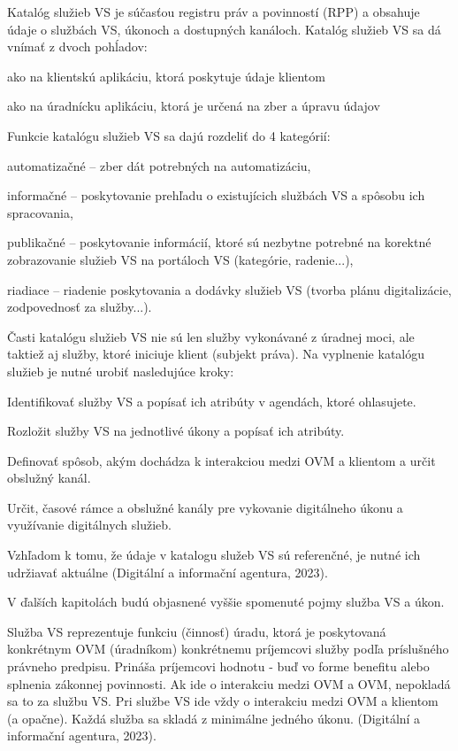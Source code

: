 Katalóg služieb VS je súčasťou registru práv a povinností (RPP) a obsahuje údaje o službách VS, úkonoch a dostupných kanáloch. Katalóg služieb VS sa dá vnímať z dvoch pohĺadov:

\startitemize[a]
\item{ako na klientskú aplikáciu, ktorá poskytuje údaje klientom}
\item{ako na úradnícku aplikáciu, ktorá je určená na zber a úpravu údajov}
\stopitemize

Funkcie katalógu služieb VS sa dajú rozdeliť do 4 kategórií:

\startitemize
\item{automatizačné – zber dát potrebných na automatizáciu,}
\item{informačné – poskytovanie prehľadu o existujícich službách VS a spôsobu ich spracovania,}
\item{publikačné – poskytovanie informácií, ktoré sú nezbytne potrebné na korektné zobrazovanie služieb VS na portáloch VS (kategórie, radenie...),}
\item{riadiace – riadenie poskytovania a dodávky služieb VS (tvorba plánu digitalizácie, zodpovednosť za služby...).}
\stopitemize

Časti katalógu služieb VS nie sú len služby vykonávané z úradnej moci, ale taktiež aj služby, ktoré iniciuje klient (subjekt práva). Na vyplnenie katalógu služieb je nutné urobiť nasledujúce kroky:

\startitemize[n]
\item{Identifikovať služby VS a popísať ich atribúty v agendách, ktoré ohlasujete.}
\item{Rozložit služby VS na jednotlivé úkony a popísať ich atribúty.}
\item{Definovať spôsob, akým dochádza k interakciou medzi OVM a klientom a určit obslužný kanál.}
\item{Určit, časové rámce a obslužné kanály pre vykovanie digitálneho úkonu a využívanie digitálnych služieb.}
\stopitemize

Vzhľadom k tomu, že údaje v katalogu služeb VS sú referenčné, je nutné ich udržiavať aktuálne \scr(Digitální a informační agentura, 2023).

V ďalších kapitolách budú objasnené vyššie spomenuté pojmy služba VS a úkon.

Služba VS reprezentuje funkciu (činnosť) úradu, ktorá je poskytovaná konkrétnym OVM (úradníkom) konkrétnemu príjemcovi služby podľa príslušného právneho predpisu. Prináša príjemcovi hodnotu - buď vo forme benefitu alebo splnenia zákonnej povinnosti. Ak ide o interakciu medzi OVM a OVM, nepokladá sa to za službu VS. Pri službe VS ide vždy o interakciu medzi OVM a klientom (a opačne). Každá služba sa skladá z minimálne jedného úkonu. \scr(Digitální a informační agentura, 2023).

